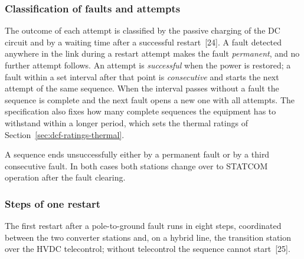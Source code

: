 \subsubsection{Classification of faults and attempts}
\label{sec:dcf-sequence-classification}

The outcome of each attempt is classified by the passive charging of the DC
circuit and by a waiting time after a successful restart~[24]. A fault
detected anywhere in the link during a restart attempt makes the fault
\emph{permanent}, and no further attempt follows. An attempt is
\emph{successful} when the power is restored; a fault within a set interval
after that point is \emph{consecutive} and starts the next attempt of the
same sequence. When the interval passes without a fault the sequence is
complete and the next fault opens a new one with all attempts. The
specification also fixes how many complete sequences the equipment has to
withstand within a longer period, which sets the thermal ratings of
Section~\ref{sec:dcf-ratings-thermal}.

A sequence ends unsuccessfully either by a permanent fault or by a third
consecutive fault. In both cases both stations change over to STATCOM
operation after the fault clearing.

\subsubsection{Steps of one restart}
\label{sec:dcf-sequence-steps}

The first restart after a pole-to-ground fault runs in eight steps,
coordinated between the two converter stations and, on a hybrid line, the
transition station over the HVDC telecontrol; without telecontrol the
sequence cannot start~[25].

